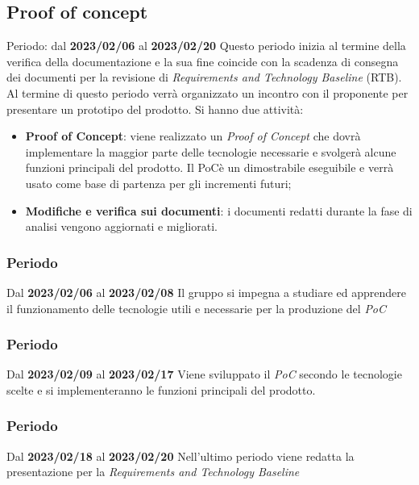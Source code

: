 \subsection{Proof of concept}
Periodo: dal \textbf{2023/02/06} al \textbf{2023/02/20} \newline
Questo periodo inizia al termine della verifica della documentazione e la sua fine coincide con la scadenza
di consegna dei documenti per la revisione di \textit{Requirements and Technology Baseline\glo } (RTB\glo ).
Al termine di questo periodo verrà organizzato un incontro con il proponente per presentare un prototipo del prodotto.\newline
Si hanno due attività:
\begin{itemize}
        \item \textbf{Proof of Concept}: viene realizzato un \textit{Proof of Concept} che dovrà implementare la maggior 
        parte delle tecnologie necessarie e svolgerà alcune funzioni principali del prodotto. Il PoC\glo  è un dimostrabile eseguibile
        e verrà usato come base di partenza per gli incrementi futuri;
        \item \textbf{Modifiche e verifica sui documenti}: i documenti redatti durante la fase di analisi vengono aggiornati e migliorati.
\end{itemize}
\subsubsection{ Periodo}
Dal \textbf{2023/02/06} al \textbf{2023/02/08}
\newline
Il gruppo si impegna a studiare ed apprendere il funzionamento delle tecnologie utili e necessarie per la produzione del \textit{PoC}

\subsubsection{ Periodo}
Dal \textbf{2023/02/09} al \textbf{2023/02/17}
\newline
Viene sviluppato il \textit{PoC} secondo le tecnologie scelte e si implementeranno le funzioni principali del prodotto.

\subsubsection{ Periodo}
Dal \textbf{2023/02/18} al \textbf{2023/02/20}
\newline
Nell'ultimo periodo viene redatta la presentazione per la \textit{Requirements and Technology Baseline}

